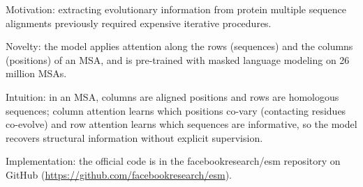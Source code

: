\documentclass[11pt,a4paper]{article}
\begin{document}
Motivation: extracting evolutionary information from protein multiple
sequence alignments previously required expensive iterative procedures.

Novelty: the model applies attention along the rows (sequences) and the
columns (positions) of an MSA, and is pre-trained with masked language
modeling on 26 million MSAs.

Intuition: in an MSA, columns are aligned positions and rows are
homologous sequences; column attention learns which positions co-vary
(contacting residues co-evolve) and row attention learns which sequences
are informative, so the model recovers structural information without
explicit supervision.

Implementation: the official code is in the facebookresearch/esm
repository on GitHub (\url{https://github.com/facebookresearch/esm}).
\end{document}
